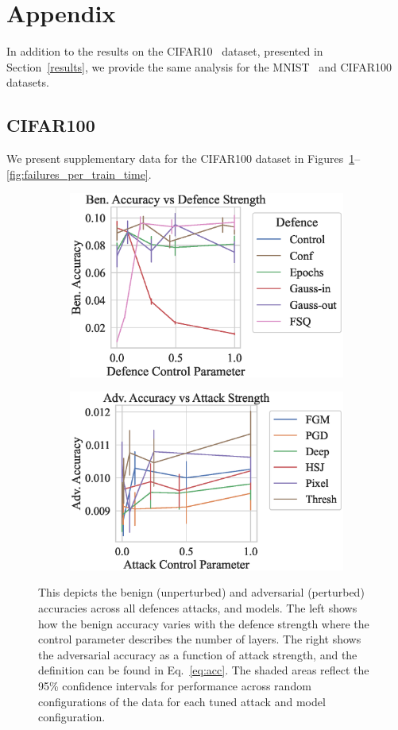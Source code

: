 \newpage
\onecolumn
\section{Appendix}
\label{appendix}

In addition to the results on the CIFAR10~\citep{cifar} dataset, presented in Section~\ref{results}, we provide the same analysis for the MNIST~\citep{mnist} and CIFAR100~\citep{cifar} datasets.

\subsection{CIFAR100}

We present supplementary data for the CIFAR100 dataset in Figures~\ref{fig:strength}--\ref{fig:failures_per_train_time}.

\begin{figure}[h!]
    \centering
    \begin{subfigure}
        \centering
        \includegraphics[trim={0 20pt 0 10pt},clip,width=.45\textwidth]{cifar100/def_param_vs_accuracy.eps}
    \end{subfigure}
    \begin{subfigure}
        \centering
        \includegraphics[trim={0 20pt 0 10pt},clip,width=.45\textwidth]{cifar100/atk_param_vs_accuracy.eps}
    \end{subfigure}
    \caption{This depicts the benign (unperturbed) and adversarial (perturbed) accuracies across all defences attacks, and models. The left shows how the benign accuracy varies with the defence strength where the control parameter describes the number of layers. The right shows the adversarial accuracy as a function of attack strength, and the definition can be found in Eq.~\ref{eq:acc}. The shaded areas reflect the 95\% confidence intervals for performance across random configurations of the data for each tuned attack and model configuration.}
    \label{fig:strength}
\end{figure}


